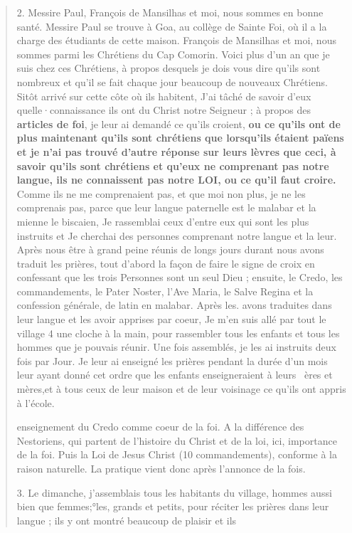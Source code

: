 \begin{quote}
2. Messire Paul, François de Mansilhas et moi, nous sommes en
bonne santé. Messire Paul se trouve à Goa, au collège de Sainte
Foi, où il a la charge des étudiants de cette maison. François de
Mansilhas et moi, nous sommes parmi les Chrétiens du Cap Comorin.
Voici plus d'un an que je suis chez ces Chrétiens, à propos desquels
je dois vous dire qu'ils sont nombreux et qu'il se fait chaque jour
beaucoup de nouveaux Chrétiens. Sitôt arrivé sur cette côte
où ils habitent, J'ai tâché de savoir d'eux quelle·connaissance ils
ont du Christ notre Seigneur ; à propos des \textbf{articles de foi}, je leur
ai demandé ce qu'ils croient, \textbf{ou ce qu'ils ont de plus maintenant
qu'ils sont chrétiens que lorsqu'ils étaient païens et je n'ai pas
trouvé d'autre réponse sur leurs lèvres que ceci, à savoir qu'ils sont
chrétiens et qu'eux ne comprenant pas notre langue, ils ne connaissent
pas notre LOI, ou ce qu'il faut croire.} Comme ils ne me comprenaient
pas, et que moi non plus, je ne les comprenais pas, parce
que leur langue paternelle est le malabar et la mienne le biscaien, Je rassemblai ceux d'entre eux qui sont les plus instruits et
Je cherchai des personnes comprenant notre langue et la leur.
Après nous être à grand peine réunis de longs jours durant nous
avons traduit les prières, tout d'abord la façon de faire le signe de
croix en confessant que les trois Personnes sont un seul Dieu ;
ensuite, le Credo, les commandements, le Pater Noster, l'Ave
Maria, le Salve Regina et la confession générale, de latin en malabar.
Après les. avons traduites dans leur langue et les avoir apprises
par coeur, Je m'en suis allé par tout le village 4 une cloche à la
main, pour rassembler tous les enfants et tous les hommes que je
pouvais réunir. Une fois assemblés, je les ai instruits deux fois par
Jour. Je leur ai enseigné les prières pendant la durée d'un mois leur
ayant donné cet ordre que les enfants enseigneraient à leurs ~ères
et mères,et à tous ceux de leur maison et de leur voisinage ce qu'ils
ont appris à l'école.
\begin{Synthesis}
enseignement du Credo comme coeur de la foi. A la différence des Nestoriens, qui partent de l'histoire du Christ et de la loi, ici, importance de la foi.
Puis la Loi de Jesus Christ (10 commandements), conforme à la raison naturelle. La pratique vient donc après l'annonce de la fois. 
\end{Synthesis}
3. Le dimanche, j'assemblais tous les habitants du village, hommes
aussi bien que femmes;°les, grands et petits, pour réciter les prières
dans leur langue ; ils y ont montré beaucoup de plaisir et ils

\end{quote}
